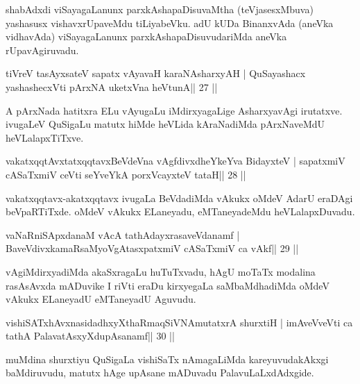 \begin{artha}
shabAdxdi viSayagaLanunx parxkAshapaDisuvaMtha (teVjasesxMbuva) yashasusx vishavxrUpaveMdu tiLiyabeVku. adU kUDa BinanxvAda (aneVka vidhavAda) viSayagaLanunx parxkAshapaDisuvudariMda aneVka rUpavAgiruvadu.
\end{artha}

\begin{shl}
tiVreV tasAyx\s\s sateV sapatx vAyavaH karaNAsharxyAH |
QuSayashacx yashashecxVti pArxNA uketxVna heVtunA\hfill || 27 ||
\end{shl}

\begin{artha}
A pArxNada hatitxra ELu vAyugaLu iMdirxyagaLige AsharxyavAgi irutatxve. ivugaLeV QuSigaLu matutx hiMde heVLida kAraNadiMda pArxNaveMdU heVLalapxTiTxve.
\end{artha}

\begin{shl}
vakatxqqtAvxtatxqqtavxBeVdeVna vAgfdivxdheYkeYva BidayxteV |
sapatxmiV cASaTxmiV ceVti seYveYkA porxVcayxteV tataH\hfill || 28 ||
\end{shl}

\begin{artha}
vakatxqqtavx-akatxqqtavx ivugaLa BeVdadiMda vAkukx oMdeV AdarU eraDAgi beVpaRTiTxde. oMdeV vAkukx ELaneyadu, eMTaneyadeMdu heVLalapxDuvadu.
\end{artha}



\begin{shl}
vaNaRniSApxdanaM vAcA tathA\s\s dayxrasaveVdanamf |
BaveVdivxkamaRsaMyoVgAtasxpatxmiV cASaTxmiV ca vAkf\hfill || 29 ||
\end{shl}

\begin{artha}
vAgiMdirxyadiMda akaSxragaLu huTuTxvadu, hAgU moTaTx modalina rasAsAvxda mADuvike I riVti eraDu kirxyegaLa saMbaMdhadiMda oMdeV vAkukx ELaneyadU eMTaneyadU Aguvudu.
\end{artha}


\begin{shl}
vishiSATxhAvxnasidadhxyXthaRmaqSiVNAmutatxrA shurxtiH |
imAveVveVti ca tathA PalavatAsxyXdupAsanamf\hfill || 30 ||
\end{shl}

\begin{artha}
muMdina shurxtiyu QuSigaLa vishiSaTx nAmagaLiMda kareyuvudakAkxgi
baMdiruvudu, matutx hAge upAsane mADuvadu PalavuLaLxdAdxgide.
\end{artha}


